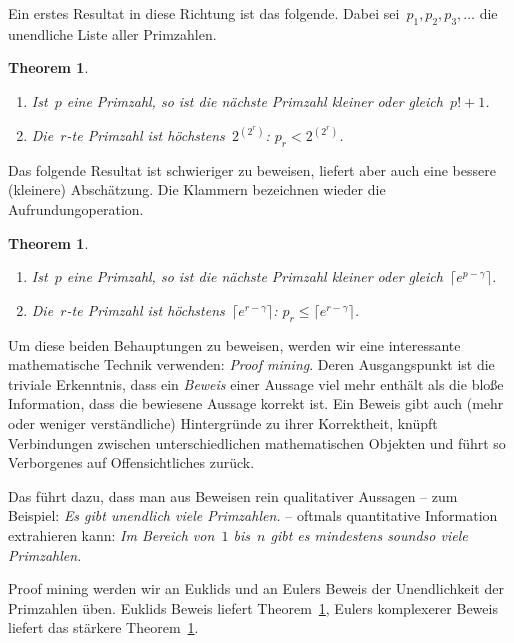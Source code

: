 \documentclass[twoside]{../zirkelblatt1415}
\theoremstyle{definition}
\theoremstyle{plain}
\newtheorem{thm}[defn]{Theorem}
\theoremstyle{remark}
\begin{document}
Ein erstes Resultat in diese Richtung ist das folgende. Dabei
sei~$p_1,p_2,p_3,\ldots$ die unendliche Liste aller Primzahlen.

\begin{thm}\label{thm:schranke1}\ \\[-2em]
\begin{enumerate}
\item
Ist~$p$ eine Primzahl, so ist die nächste Primzahl kleiner oder gleich~$p! + 1$. \\[-2em]
\item
Die~$r$-te Primzahl ist höchstens~$2^{(2^r)}$: $p_r < 2^{(2^r)}$.
\end{enumerate}
\end{thm}

Das folgende Resultat ist schwieriger zu beweisen, liefert aber auch eine
bessere (kleinere) Abschätzung. Die Klammern bezeichnen wieder die
Aufrundungoperation.

\begin{thm}\label{thm:schranke2}\ \\[-2em]
\begin{enumerate}
\item
Ist~$p$ eine Primzahl, so ist die nächste Primzahl kleiner oder gleich~$\lceil e^{p-\gamma}
\rceil$. \\[-2em]
\item
Die~$r$-te Primzahl ist höchstens~$\lceil e^{r-\gamma} \rceil$: $p_r
\leq \lceil e^{r-\gamma} \rceil$.
\end{enumerate}
\end{thm}

Um diese beiden Behauptungen zu beweisen, werden wir eine interessante
mathematische Technik verwenden: \emph{Proof mining}. Deren Ausgangspunkt ist
die triviale Erkenntnis, dass ein \emph{Beweis} einer Aussage viel mehr enthält
als die bloße Information, dass die bewiesene Aussage korrekt ist. Ein Beweis
gibt auch (mehr oder weniger verständliche) Hintergründe zu ihrer Korrektheit,
knüpft Verbindungen zwischen unterschiedlichen mathematischen Objekten und
führt so Verborgenes auf Offensichtliches zurück.

Das führt dazu, dass man aus Beweisen rein qualitativer Aussagen -- zum
Beispiel: \emph{Es gibt unendlich viele Primzahlen.} -- oftmals quantitative
Information extrahieren kann: \emph{Im Bereich von~$1$ bis~$n$ gibt es
mindestens soundso viele Primzahlen.}

Proof mining werden wir an Euklids und an Eulers Beweis der Unendlichkeit der
Primzahlen üben. Euklids Beweis liefert Theorem~\ref{thm:schranke1}, Eulers
komplexerer Beweis liefert das stärkere Theorem~\ref{thm:schranke2}.
\end{document}
